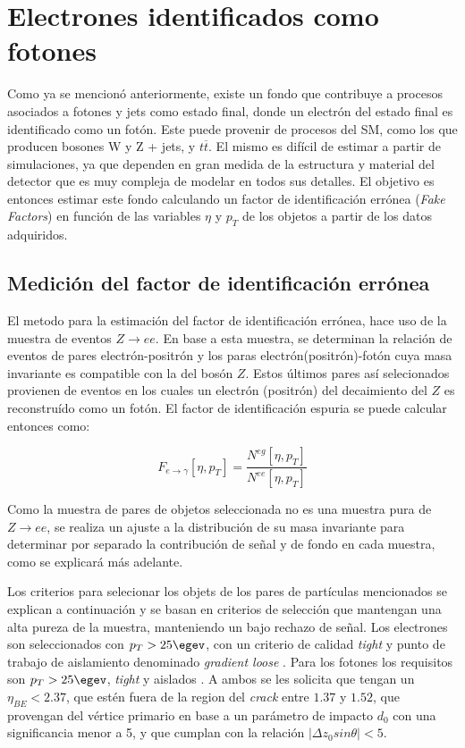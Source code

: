 \chapter{Electrones identificados como fotones}\label{ch:e_fake}

Como ya se mencionó anteriormente, existe un fondo que contribuye a procesos asociados a fotones y jets como estado final, donde un electrón del estado final es identificado como un fotón. Este puede provenir de procesos del SM, como los que producen bosones W y Z + jets, y $t \overline{t}$. El mismo es difícil de estimar a partir de simulaciones, ya que dependen en gran medida de la estructura y material del detector que es muy compleja de modelar en todos sus detalles. El objetivo es entonces estimar este fondo calculando un factor de identificación errónea (\textit{Fake Factors}) en función de las variables $\eta$ y $p_{T}$ de los objetos a partir de los datos adquiridos.

\section{Medición del factor de identificación errónea}

El metodo para la estimación del factor de identificación errónea, hace uso de la muestra de eventos $Z\rightarrow ee$. En base a esta muestra, se determinan la relación de eventos de pares electrón-positrón y los paras electrón(positrón)-fotón cuya masa invariante es compatible con la del bosón $Z$. Estos últimos pares así selecionados provienen de eventos en los cuales un electrón (positrón) del decaimiento del $Z$ es reconstruído como un fotón. El factor de identificación espuria se puede calcular entonces como: 

\begin{equation}
F_{e\rightarrow\gamma}[\eta , p_{T}]=\frac{N^{eg}[\eta , p_{T}]}{N^{ee}[\eta , p_{T}]} \label{eq:ff_ratio}
\end{equation}

Como la muestra de pares de objetos seleccionada no es una muestra pura de $Z\rightarrow ee$, se realiza un ajuste a la distribución de su masa invariante para determinar por separado la contribución de señal y de fondo en cada muestra, como se explicará más adelante.

Los criterios para selecionar los objets de los pares de partículas mencionados se explican a continuación y se basan en criterios de selección que mantengan una alta pureza de la muestra, manteniendo un bajo rechazo de señal.
Los electrones  son seleccionados con $p_{T} > 25 \egev$, con un criterio de calidad \textit{tight} y punto de trabajo de aislamiento denominado \textit{gradient loose} \cite{ATLAS-CONF-2016-024}. Para los fotones los requisitos son $p_{T} > 25 \egev$, \textit{tight} y aislados \cite{STDM-2010-08}. A ambos se les solicita que tengan un $\eta_{BE}<2.37$, que estén fuera de la region del \textit{crack} entre $1.37$ y $1.52$, que provengan del vértice primario en base a un parámetro de impacto $d_{0}$ con una significancia menor a 5, y que cumplan con la relación $|\Delta z_{0}sin\theta|<5$.

